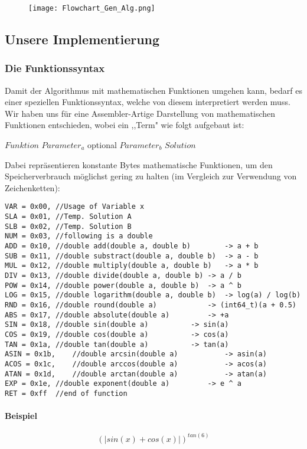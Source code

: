 \documentclass[a4paper,12pt]{article}
\begin{document}
\begin{figure}[H]
\texttt{[image: Flowchart\_Gen\_Alg.png]}
\end{figure}

\subsection{Unsere Implementierung}
\subsubsection{Die Funktionssyntax}
Damit der Algorithmus mit mathematischen Funktionen umgehen kann, bedarf es einer speziellen Funktionssyntax, welche von diesem interpretiert werden muss.\\
Wir haben uns für eine Assembler-Artige Darstellung von mathematischen Funktionen entschieden, wobei ein ,,Term" wie folgt aufgebaut ist:
\indent \begin{center}
$Funktion$ $Parameter_a$ optional $Parameter_b$ $Solution$\\
\end{center}
Dabei repräsentieren konstante Bytes mathematische Funktionen, um den Speicherverbrauch möglichst gering zu halten (im Vergleich zur Verwendung von Zeichenketten):

\begin{verbatim}
VAR = 0x00,	//Usage of Variable x
SLA = 0x01,	//Temp. Solution A
SLB = 0x02,	//Temp. Solution B
NUM = 0x03,	//following is a double
ADD = 0x10,	//double add(double a, double b)		-> a + b
SUB = 0x11,	//double substract(double a, double b)	-> a - b
MUL = 0x12,	//double multiply(double a, double b)	-> a * b
DIV = 0x13,	//double divide(double a, double b)	-> a / b
POW = 0x14,	//double power(double a, double b)	-> a ^ b
LOG = 0x15,	//double logarithm(double a, double b)	-> log(a) / log(b)
RND = 0x16,	//double round(double a)			-> (int64_t)(a + 0.5)
ABS = 0x17,	//double absolute(double a)			-> +a
SIN = 0x18,	//double sin(double a)			-> sin(a)
COS = 0x19,	//double cos(double a)			-> cos(a)
TAN = 0x1a,	//double tan(double a)			-> tan(a)
ASIN = 0x1b,	//double arcsin(double a)			-> asin(a)
ACOS = 0x1c,	//double arccos(double a)			-> acos(a)
ATAN = 0x1d,	//double arctan(double a)			-> atan(a)
EXP = 0x1e,	//double exponent(double a)			-> e ^ a
RET = 0xff	//end of function
\end{verbatim}
\newpage

\paragraph{Beispiel\\}
\[(|sin(x) + cos(x)|)^{tan(6)}\]\\
\end{document}
